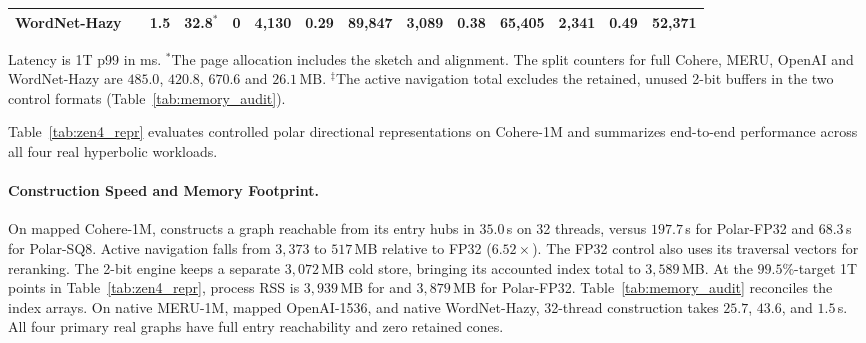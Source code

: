\begin{table}[t]
\begin{tabular}{@{}llrrrrrrrrrrrr@{}}
    WordNet-Hazy & \textbf{\rquiver{}} & \textbf{1.5} & \textbf{32.8}$^*$ & \textbf{0} & \textbf{4,130} & \textbf{0.29} & \textbf{89,847} & \textbf{3,089} & \textbf{0.38} & \textbf{65,405} & \textbf{2,341} & \textbf{0.49} & \textbf{52,371} \\
    \bottomrule
  \end{tabular}
  \par\vspace{2pt}
  {\footnotesize Latency is 1T p99 in ms. $^*$The page allocation includes the sketch and alignment. The split counters for full {Cohere}, {MERU}, {OpenAI} and {WordNet-Hazy} are $485.0$, $420.8$, $670.6$ and $26.1$\,MB. $^\ddagger$The active navigation total excludes the retained, unused 2-bit buffers in the two control formats (Table~\ref{tab:memory_audit}). }
\end{table}

Table~\ref{tab:zen4_repr} evaluates controlled polar directional representations on {Cohere-1M} and summarizes end-to-end \rquiver{} performance across all four real hyperbolic workloads.

\paragraph{Construction Speed and Memory Footprint.}
On mapped {Cohere-1M}, \rquiver{} constructs a graph reachable from its entry hubs in $35.0$\,s on 32 threads, versus $197.7$\,s for {Polar-FP32} and $68.3$\,s for {Polar-SQ8}. Active navigation falls from $3{,}373$ to $517$\,MB relative to FP32 ($6.52\times$). The FP32 control also uses its traversal vectors for reranking. The 2-bit engine keeps a separate $3{,}072$\,MB cold store, bringing its accounted index total to $3{,}589$\,MB. At the $99.5\%$-target 1T points in Table~\ref{tab:zen4_repr}, process RSS is $3{,}939$\,MB for \rquiver{} and $3{,}879$\,MB for {Polar-FP32}. Table~\ref{tab:memory_audit} reconciles the index arrays.
On native {MERU-1M}, mapped {OpenAI-1536}, and native {WordNet-Hazy}, 32-thread construction takes $25.7$, $43.6$, and $1.5$\,s. All four primary real graphs have full entry reachability and zero retained cones.

